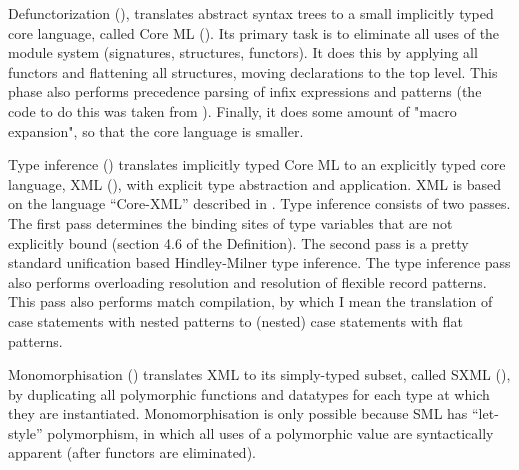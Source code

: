 Defunctorization (), translates abstract
syntax trees to a small implicitly typed core language, called Core ML
().  Its primary task is to eliminate all uses of the
module system (signatures, structures, functors).  It does this by
applying all functors and flattening all structures, moving
declarations to the top level.  This phase also performs precedence
parsing of infix expressions and patterns (the code to do this was
taken from \smlnj).  Finally, it does some amount of "macro
expansion", so that the core language is smaller.

Type inference () translates implicitly typed
Core ML to an explicitly typed core language, XML (),
with explicit type abstraction and application.  XML is based on the
language ``Core-XML'' described in \cite{HarperMitchell93}.  Type
inference consists of two passes.  The first pass determines the
binding sites of type variables that are not explicitly bound (section
4.6 of the Definition).  The second pass is a
pretty standard unification based Hindley-Milner type
inference\cite{DamasMilner82}.  The type inference pass also performs
overloading resolution and resolution of flexible record patterns.
This pass also performs match compilation, by which I mean the
translation of case statements with nested patterns to (nested) case
statements with flat patterns.

Monomorphisation () translates XML to its
simply-typed subset, called SXML (), by duplicating all
polymorphic functions and datatypes for each type at which they are
instantiated.  Monomorphisation is only possible because SML has
``let-style'' polymorphism, in which all uses of a polymorphic value
are syntactically apparent (after functors are eliminated).
